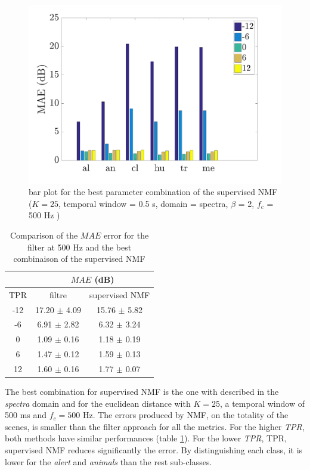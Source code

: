 \documentclass[twocolumn,a4paper,10pt]{article}
\begin{document}
\begin{figure}[h]
\centering
\includegraphics[width=\linewidth]{../image/AmbianceNmfSupervised.pdf}
\caption{bar plot for the best parameter combination of the supervised NMF ($K = 25$, temporal window = 0.5 s, domain = spectra, $\beta$ = 2, $f_c$ = 500 Hz )}
\label{fig:nmfSupervisedAmbiance}
\end{figure}

\begin{table}[h]
\centering
\begin{tabular}{ccc}
    & \multicolumn{2}{c}{$MAE$ (dB)} \\ \hline
TPR & filtre & supervised NMF \\ \hline
 -12 & 17.20 $\pm$ 4.09 & 15.76 $\pm$ 5.82 \\
 -6 &  6.91 $\pm$ 2.82 & 6.32 $\pm$ 3.24\\
 0 & 1.09 $\pm$ 0.16 & 1.18 $\pm$ 0.19\\
  6 &  1.47 $\pm$ 0.12 & 1.59 $\pm$ 0.13\\
 12 &  1.60 $\pm$ 0.16 & 1.77 $\pm$ 0.07
\end{tabular}
\caption{Comparison of the $MAE$ error for the filter at 500 Hz and the best combinaison of the supervised NMF}
\label{tab:resultsComparison}
\end{table}


The best combination for supervised NMF is the one with described in the \textit{spectra} domain and for the euclidean distance with $K = 25$, a temporal window of 500 ms and $f_c = 500$ Hz. The errors produced by NMF, on the totality of the scenes, is smaller than the filter approach for all the metrics. For the higher \textit{TPR}, both methods have similar performances (table \ref{tab:resultsComparison}). For the lower \textit{TPR}, TPR, supervised NMF reduces significantly the error. By distinguishing each class, it is lower for the \textit{alert} and \textit{animals} than the rest sub-classes. \\
\end{document}
